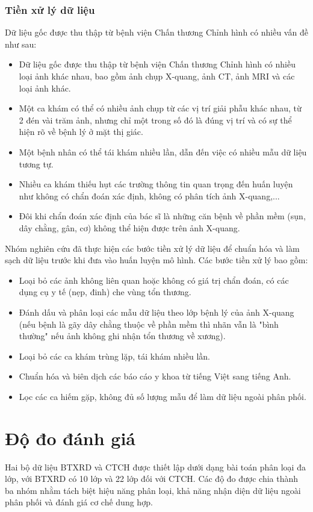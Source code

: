 \subsubsection{Tiền xử lý dữ liệu}
Dữ liệu gốc được thu thập từ bệnh viện Chấn thương Chỉnh hình có nhiều vấn đề như sau:
\begin{itemize}
    \item Dữ liệu gốc được thu thập từ bệnh viện Chấn thương Chỉnh hình có nhiều loại ảnh khác nhau, bao gồm ảnh chụp X-quang, ảnh CT, ảnh MRI và các loại ảnh khác.
    \item Một ca khám có thể có nhiều ảnh chụp từ các vị trí giải phẫu khác nhau, từ 2 đén vài trăm ảnh,
nhưng chỉ một trong số đó là đúng vị trí và có sự thể hiện rõ về bệnh lý ở mặt thị giác.
    \item Một bệnh nhân có thể tái khám nhiều lần, dẫn đến việc có nhiều mẫu dữ liệu tương tự.
    \item Nhiều ca khám thiếu hụt các trường thông tin quan trọng đến huấn luyện như không có chẩn đoán xác định, không có phân tích ảnh X-quang,...
    \item Đôi khi chẩn đoán xác định của bác sĩ là những căn bệnh về phần mềm (sụn, dây chằng, gân, cơ) không thể hiện được trên ảnh X-quang.
\end{itemize}
Nhóm nghiên cứu đã thực hiện các bước tiền xử lý dữ liệu để chuẩn hóa và làm sạch dữ liệu trước khi đưa vào huấn luyện mô hình. Các bước tiền xử lý bao gồm:
\begin{itemize}
    \item Loại bỏ các ảnh không liên quan hoặc không có giá trị chẩn đoán, có các dụng cụ y tế (nẹp, đinh) che vùng tổn thương.
    \item Đánh dấu và phân loại các mẫu dữ liệu theo lớp bệnh lý của ảnh X-quang
(nếu bệnh là gãy dây chằng thuộc về phần mềm thì nhãn vẫn là "bình thường" nếu ảnh không ghi nhận tổn thương về xương).
    \item Loại bỏ các ca khám trùng lặp, tái khám nhiều lần.
    \item Chuẩn hóa và biên dịch các báo cáo y khoa từ tiếng Việt sang tiếng Anh.
    \item Lọc các ca hiếm gặp, không đủ số lượng mẫu để làm dữ liệu ngoài phân phối.
\end{itemize}

\section{Độ đo đánh giá}
\label{sec:evaluation_metrics}
Hai bộ dữ liệu BTXRD \cite{Yao2025} và CTCH được thiết lập dưới dạng bài toán phân loại đa lớp, với BTXRD có 10 lớp và 22 lớp đối với CTCH. Các độ đo được chia thành ba nhóm nhằm tách biệt hiệu năng phân loại, khả năng nhận diện dữ liệu ngoài phân phối và đánh giá cơ chế dung hợp.
